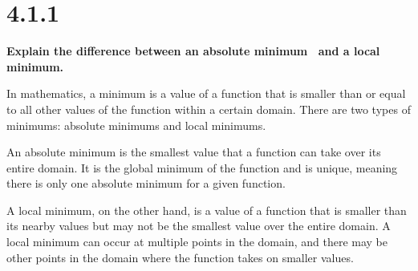 \section*{4.1.1}
\textbf{
    Explain the difference between an absolute minimum \
    and a local minimum.
}
\par
   In mathematics, a minimum is a value of a function that is smaller than or equal to all other values of the function within a certain domain. There are two types of minimums: absolute minimums and local minimums.
\par
   An absolute minimum is the smallest value that a function can take over its entire domain. It is the global minimum of the function and is unique, meaning there is only one absolute minimum for a given function.
\par
   A local minimum, on the other hand, is a value of a function that is smaller than its nearby values but may not be the smallest value over the entire domain. A local minimum can occur at multiple points in the domain, and there may be other points in the domain where the function takes on smaller values.

